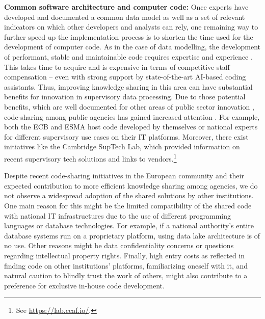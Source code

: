 \documentclass[a4paper, 11pt]{report}
\begin{document}
\textbf{Common software architecture and computer code:} Once experts have developed and documented a common data model as well as a set of relevant indicators on which other developers and analysts can rely, one remaining way to further speed up the implementation process is to shorten the time used for the development of computer code. As in the case of data modelling, the development of performant, stable and maintainable code requires expertise and experience \parencite{Martin.2018, Ousterhout.2021}. This takes time to acquire and is expensive in terms of competitive staff compensation -- even with strong support by state-of-the-art AI-based coding assistants. Thus, improving knowledge sharing in this area can have substantial benefits for innovation in supervisory data processing. Due to those potential benefits, which are well documented for other areas of public sector innovation \parencite{Hartley.2013, Criado.2025}, code-sharing among public agencies has gained increased attention \parencite{Duijm.2024}. For example, both the ECB and ESMA host code developed by themselves or national experts for different supervisory use cases on their IT platforms. Moreover, there exist initiatives like the Cambridge SupTech Lab, which provided information on recent supervisory tech solutions and links to vendors.\footnote{See \url{https://lab.ccaf.io/}.}

Despite recent code-sharing initiatives in the European community and their expected contribution to more efficient knowledge sharing among agencies, we do not observe a widespread adoption of the shared solutions by other institutions. One main reason for this might be the limited compatibility of the shared code with national IT infrastructures due to the use of different programming languages or database technologies. For example, if a national authority's entire database systems run on a proprietary platform, using data lake architecture is of no use. Other reasons might be data confidentiality concerns or questions regarding intellectual property rights. Finally, high entry costs as reflected in finding code on other institutions' platforms, familiarizing oneself with it, and natural caution to blindly trust the work of others, might also contribute to a preference for exclusive in-house code development.
\end{document}
